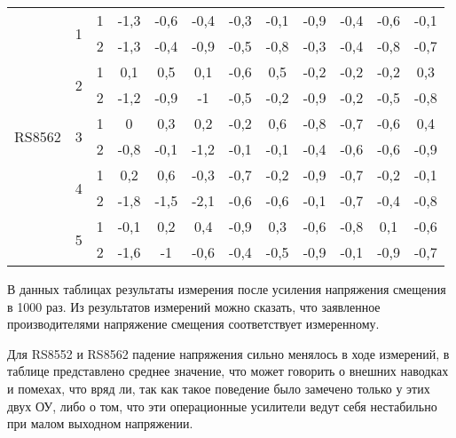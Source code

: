 \begin{table}[H]
\begin{tabular}{|c|c|c|c|c|c|c|c|c|c|c|c|}
      \hline
      \multicolumn{1}{|c|}{\multirow{10}[20]{*}{RS8562}} & \multirow{2}[4]{*}{1} & 1     & -1,3  & -0,6  & -0,4  & -0,3  & -0,1  & -0,9  & -0,4  & -0,6  & -0,1 \bigstrut\\
  \cline{3-12}          &       & 2     & -1,3  & -0,4  & -0,9  & -0,5  & -0,8  & -0,3  & -0,4  & -0,8  & -0,7 \bigstrut\\
  \cline{2-12}          & \multirow{2}[4]{*}{2} & 1     & 0,1   & 0,5   & 0,1   & -0,6  & 0,5   & -0,2  & -0,2  & -0,2  & 0,3 \bigstrut\\
  \cline{3-12}          &       & 2     & -1,2  & -0,9  & -1    & -0,5  & -0,2  & -0,9  & -0,2  & -0,5  & -0,8 \bigstrut\\
  \cline{2-12}          & \multirow{2}[4]{*}{3} & 1     & 0     & 0,3   & 0,2   & -0,2  & 0,6   & -0,8  & -0,7  & -0,6  & 0,4 \bigstrut\\
  \cline{3-12}          &       & 2     & -0,8  & -0,1  & -1,2  & -0,1  & -0,1  & -0,4  & -0,6  & -0,6  & -0,9 \bigstrut\\
  \cline{2-12}          & \multirow{2}[4]{*}{4} & 1     & 0,2   & 0,6   & -0,3  & -0,7  & -0,2  & -0,9  & -0,7  & -0,2  & -0,1 \bigstrut\\
  \cline{3-12}          &       & 2     & -1,8  & -1,5  & -2,1  & -0,6  & -0,6  & -0,1  & -0,7  & -0,4  & -0,8 \bigstrut\\
  \cline{2-12}          & \multirow{2}[4]{*}{5} & 1     & -0,1  & 0,2   & 0,4   & -0,9  & 0,3   & -0,6  & -0,8  & 0,1   & -0,6 \bigstrut\\
  \cline{3-12}          &       & 2     & -1,6  & -1    & -0,6  & -0,4  & -0,5  & -0,9  & -0,1  & -0,9  & -0,7 \bigstrut\\
      \hline
      \end{tabular}%
    \label{tab:Vcm2}%
  \end{table}
В данных таблицах результаты измерения после усиления напряжения смещения в 1000 раз. Из результатов измерений
можно сказать, что заявленное производителями напряжение смещения соответствует измеренному. 

Для RS8552 и RS8562 падение напряжения сильно менялось в ходе измерений, в таблице представлено среднее
значение, что может говорить о внешних наводках и помехах, что вряд ли, так как такое поведение было 
замечено только у этих двух ОУ, либо о том, что эти операционные усилители ведут себя нестабильно при малом 
выходном напряжении.

